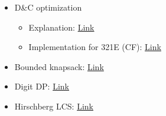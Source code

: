 \documentclass[11pt]{article}
\begin{document}
\begin{itemize}
\begin{itemize}
\end{itemize}
\item D\&C optimization
\begin{itemize}
\item Explanation: \href{https://www.youtube.com/watch?v=wLXEWuDWnzI}{Link}
\item Implementation for 321E (CF): \href{https://codeforces.com/contest/321/submission/25801193}{Link}
\end{itemize}
\item Bounded knapsack: \href{https://codeforces.com/blog/entry/59606}{Link}
\item Digit DP: \href{https://codeforces.com/blog/entry/53960}{Link}
\item Hirschberg LCS: \href{https://codeforces.com/blog/entry/47247}{Link}
\end{itemize}
\end{document}
